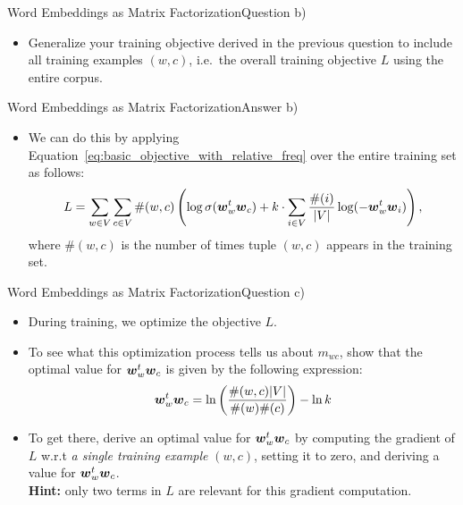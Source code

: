 \documentclass[t]{beamer}
\begin{document}
\begin{frame}{Word Embeddings as Matrix Factorization}{Question b)}
    \begin{itemize}
        \item Generalize your training objective derived in the previous
              question to include all training examples $(w,c)$, i.e.\ the
              overall training objective $L$ using the entire corpus.
    \end{itemize}
\end{frame}

\begin{frame}{Word Embeddings as Matrix Factorization}{Answer b)}
    \begin{itemize}
        \item We can do this by applying
              Equation~\ref{eq:basic_objective_with_relative_freq} over the
              entire training set as follows:
              \begin{align}\label{eq:general_objective_with_relative_freq}
                  L = \sum_{w\in V} \sum_{c\in V} \#(w,c)\left(\log \sigma({\boldsymbol{w}}_w^t{\boldsymbol{w}}_c) + k\cdot \sum_{i\in V} \frac{\#(i)}{|V|}\log(-{\boldsymbol{w}}_w^t{\boldsymbol{w}}_i)\right),
              \end{align}
              where $\#(w,c)$ is the number of times tuple $(w,c)$ appears in
              the training set.
    \end{itemize}
\end{frame}

\begin{frame}{Word Embeddings as Matrix Factorization}{Question c)}
    \begin{itemize}
        \item During training, we optimize the objective $L$.
        \item To see what this optimization process tells us about $m_{wc}$,
              show that the optimal value for ${\boldsymbol{w}}_w^t{\boldsymbol{w}}_c$ is given by the
              following expression:
              \begin{align}\label{eq:pmi_equality}
                  {\boldsymbol{w}}_w^t{\boldsymbol{w}}_c = \ln\left(\frac{\#(w,c) |V|}{\#(w) \#(c)}\right) - \ln k
              \end{align}
        \item To get there, derive an optimal value for ${\boldsymbol{w}}_w^t{\boldsymbol{w}}_c$ by
              computing the gradient of $L$ w.r.t
              \emph{a single training example} $(w,c)$, setting it to zero, and
              deriving a value for ${\boldsymbol{w}}_w^t{\boldsymbol{w}}_c$. \\
              \textbf{Hint:} only two terms in $L$ are relevant for this
              gradient computation.
    \end{itemize}
\end{frame}
\end{document}
